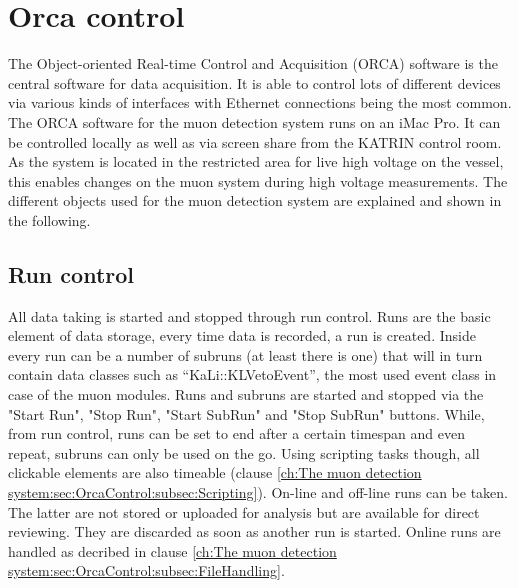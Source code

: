 
  \section{Orca control}
  \label{ch:The muon detection system:sec:OrcaControl}
  The Object-oriented Real-time Control and Acquisition \cite{How09} (ORCA) software is the central software for data acquisition. It is able to control lots of different devices via various kinds of interfaces with Ethernet connections being the most common. The ORCA software for the muon detection system runs on an iMac Pro. It can be controlled locally as well as via screen share from the KATRIN control room. As the system is located in the restricted area for live high voltage on the vessel, this enables changes on the muon system during high voltage measurements. The different objects used for the muon detection system are explained and shown in the following.

  
  
    \subsection{Run control}
    \label{ch:The muon detection system:sec:OrcaControl:subsec:RunControl}
    All data taking is started and stopped through run control. Runs are the basic element of data storage, every time data is recorded, a run is created. Inside every run can be a number of subruns (at least there is one) that will in turn contain data classes such as ``KaLi::KLVetoEvent'', the most used event class in case of the muon modules. Runs and subruns are started and stopped via the "Start Run", "Stop Run", "Start SubRun" and "Stop SubRun" buttons. While, from run control, runs can be set to end after a certain timespan and even repeat, subruns can only be used on the go. Using scripting tasks though, all clickable elements are also timeable (clause \ref{ch:The muon detection system:sec:OrcaControl:subsec:Scripting}). On-line and off-line runs can be taken. The latter are not stored or uploaded for analysis but are available for direct reviewing. They are discarded as soon as another run is started. Online runs are handled as decribed in clause \ref{ch:The muon detection system:sec:OrcaControl:subsec:FileHandling}.
    
